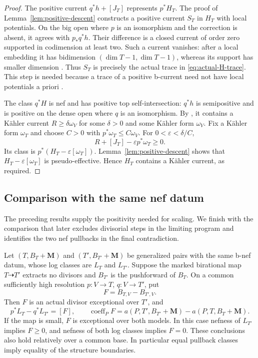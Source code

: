 \begin{proof}
The positive current $q^*h+[J_T]$ represents $p^*H_T$.
The proof of Lemma~\ref{lem:positive-descent} constructs a positive
current $S_T$ in $H_T$ with local potentials.  On the big open where
$p$ is an isomorphism and the correction is absent, it agrees with
$p_*q^*h$.  Their difference is a closed current of order zero
supported in codimension at least two.  Such a current vanishes:
after a local embedding it has bidimension
$(\dim T-1,\dim T-1)$, whereas its support has smaller dimension
\cite[Chapter~III, Corollary~2.11]{DemaillyCADG2012}.
Thus $S_T$ is precisely the actual trace in
\eqref{eq:actual-H-trace}.  This step is needed because a trace of
a positive b-current need not have local potentials a priori
\cite[Remark~2.6(ii)]{DHY2023}.

The class $q^*H$ is nef and has positive top self-intersection:
$q^*h$ is semipositive and is positive on the dense open where $q$
is an isomorphism.  By \cite[Theorem~0.5]{DemaillyPaun2004}, it contains
a K\"ahler current $R\geq\delta\omega_V$ for some $\delta>0$ and
some K\"ahler form $\omega_V$.  Fix a K\"ahler form $\omega_T$ and
choose $C>0$ with $p^*\omega_T\leq C\omega_V$.  For
$0<\varepsilon<\delta/C$,
\[
 R+[J_T]-\varepsilon p^*\omega_T\geq0.
\]
Its class is $p^*(H_T-\varepsilon[\omega_T])$.
Lemma~\ref{lem:positive-descent} shows that
$H_T-\varepsilon[\omega_T]$ is pseudo-effective.  Hence $H_T$
contains a K\"ahler current, as required.
\end{proof}

\subsection{Comparison with the same nef datum}

The preceding results supply the positivity needed for scaling.  We
finish with the comparison that later excludes divisorial steps in
the limiting program and identifies the two nef pullbacks in the
final contradiction.

\begin{lemma}\label{lem:small-comparison}
Let $(T,B_T+\mathbf M)$ and $(T',B_{T'}+\mathbf M)$ be generalized
pairs with the same b-nef datum, whose log classes are $L_T$ and
$L_{T'}$.  Suppose the marked birational map $T\dashrightarrow T'$
extracts no divisors and $B_{T'}$ is the pushforward of $B_T$.
On a common sufficiently high resolution $p:V\to T$, $q:V\to T'$, put
\[
 F=B_{T,V}-B_{T',V}.
\]
Then $F$ is an actual divisor exceptional over $T'$, and
\begin{equation}\label{eq:small-comparison}
 p^*L_T-q^*L_{T'}=[F],\qquad
 \operatorname{coeff}_P F
 =a(P,T',B_{T'}+\mathbf M)-a(P,T,B_T+\mathbf M).
\end{equation}
If the map is small, $F$ is exceptional over both models.  In this
case nefness of $L_{T'}$ implies $F\geq0$, and nefness of both log
classes implies $F=0$.  These conclusions also hold relatively over
a common base.  In particular equal pullback classes imply equality
of the structure boundaries.
\end{lemma}

